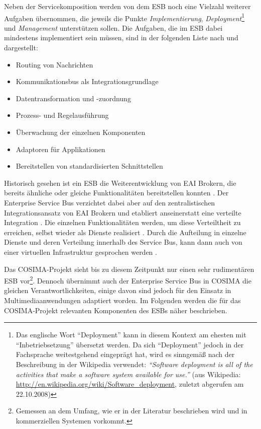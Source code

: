   Neben der Servicekomposition werden von dem ESB noch eine Vielzahl weiterer Aufgaben übernommen, die jeweils die Punkte \emph{Implementierung}, \emph{Deployment}\footnote{Das englische Wort "`Deployment"' kann in diesem Kontext am ehesten mit "`Inbetriebsetzung"' übersetzt werden. Da sich "`Deployment"' jedoch in der Fachsprache weitestgehend eingeprägt hat, wird es sinngemäß nach der Beschreibung in der Wikipedia verwendet: \emph{"`Software deployment is all of the activities that make a software system available for use."'} (aus Wikipedia: \url{http://en.wikipedia.org/wiki/Software_deployment}, zuletzt abgerufen am 22.10.2008)} und \emph{Management} unterstützen sollen. Die Aufgaben, die im ESB dabei mindestens implementiert sein müssen, sind in der folgenden Liste nach \citep[S. 137]{soa_goes_real} und \citep[S. 146]{masak2007ssb} dargestellt:
  
  \begin{itemize}
    \item Routing von Nachrichten
    \item Kommunikationsbus als Integrationsgrundlage
    \item Datentransformation und -zuordnung
    \item Prozess- und Regelausführung
    \item Überwachung der einzelnen Komponenten
    \item Adaptoren für Applikationen
    \item Bereitstellen von standardisierten Schnittstellen
  \end{itemize}

  Historisch gesehen ist ein ESB die Weiterentwicklung von EAI Brokern, die bereits ähnliche oder gleiche Funktionalitäten bereitstellen konnten \citep[S. 146]{masak2007ssb}. Der Enterprise Service Bus verzichtet dabei aber auf den zentralistischen Integrationsansatz von EAI Brokern und etabliert anseinerstatt eine verteilte Integration \citep[S. 4]{enterprise_service_bus}. Die einzelnen Funktionalitäten werden, um diese Verteiltheit zu erreichen, selbst wieder als Dienste realisiert  \citep{enterprise_service_bus,masak2007ssb,papazoglou2007soc}. Durch die Aufteilung in einzelne Dienste und deren Verteilung innerhalb des Service Bus, kann dann auch von einer virtuellen Infrastruktur gesprochen werden \citep[S. 136]{soa_goes_real}.
  
  Das COSIMA-Projekt sieht bis zu diesem Zeitpunkt nur einen sehr rudimentären ESB vor\footnote{Gemessen an dem Umfang, wie er in der Literatur beschrieben wird und in kommerziellen Systemen vorkommt.}. Dennoch übernimmt auch der Enterprise Service Bus in COSIMA die gleichen Verantwortlichkeiten, einige davon sind jedoch für den Einsatz in Multimediaanwendungen adaptiert worden. Im Folgenden werden die für das COSIMA-Projekt relevanten Komponenten des ESBs näher beschrieben.
  
